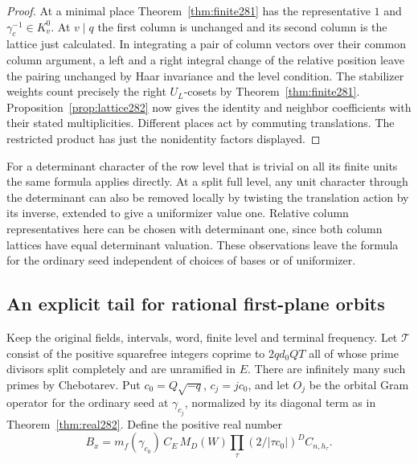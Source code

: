 \documentclass[a4paper,11pt]{article}
\theoremstyle{definition}
\theoremstyle{remark}
\numberwithin{equation}{section}
\begin{document}
\begin{proof}
At a minimal place Theorem~\ref{thm:finite281} has the
representative \(1\) and \(\gamma_c^{-1}\in K_v^0\).
At \(v\mid q\) the first column is unchanged and its second
column is the lattice just calculated. In integrating a pair
of column vectors over their common column argument, a left
and a right integral change of the relative position leave
the pairing unchanged by Haar invariance and the level
condition. The stabilizer weights count precisely the
right \(U_L\)-cosets by Theorem~\ref{thm:finite281}.
Proposition~\ref{prop:lattice282} now gives the identity
and neighbor coefficients with their stated multiplicities.
Different places act by commuting translations. The
restricted product has just the nonidentity factors displayed.
\end{proof}

For a determinant character of the row level that is trivial
on all its finite units the same formula applies directly.
At a split full level, any unit character through the
determinant can also be removed locally by twisting the
translation action by its inverse, extended to give a
uniformizer value one. Relative column representatives here
can be chosen with determinant one, since both column
lattices have equal determinant valuation. These observations
leave the formula for the ordinary seed independent of
choices of bases or of uniformizer.

\subsection{An explicit tail for rational first-plane orbits}\label{nav:IX-50}
Keep the original fields, intervals, word, finite level and
terminal frequency. Let \(\mathcal T\) consist of the positive
squarefree integers coprime to \(2q d_0QT\) all of whose prime
divisors split completely and are unramified in \(E\).
There are infinitely many such primes by Chebotarev.
Put \(c_0=Q\sqrt{-q}\), \(c_j=j c_0\), and let \(O_j\)
be the orbital Gram operator for the ordinary seed at
\(\gamma_{c_j}\), normalized by its diagonal term as in
Theorem~\ref{thm:real282}. Define the positive real number
\[
 B_x=m_f(\gamma_{c_0})\, C_E\,M_D(W)
                  \prod_\tau (2/|\tau c_0|)^D C_{n,h_\tau}.
\]
\end{document}
